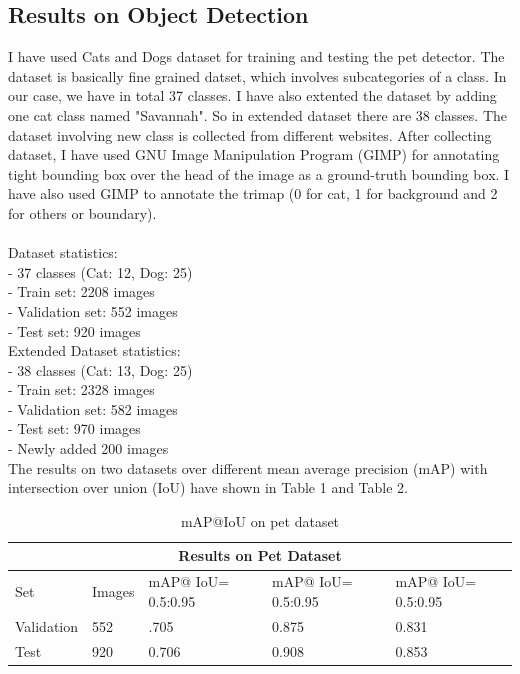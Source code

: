\documentclass[10pt,twocolumn,letterpaper]{article}
\newcommand\tab[1][1cm]{\hspace*{#1}}
\begin{document}
\subsection{Results on Object Detection}
I have used Cats and Dogs\cite{parkhi12a} dataset for training and testing the pet detector. The dataset is basically fine grained datset, which involves subcategories of a class. In our case, we have in total 37 classes. I have also extented the dataset by adding one cat class named "Savannah". So in extended dataset there are 38 classes. The dataset involving new class is collected from different websites. After collecting dataset, I have used GNU Image Manipulation Program (GIMP) for annotating tight bounding box over the head of the image as a ground-truth bounding box. I have also used GIMP to annotate the trimap (0 for cat, 1 for background and 2 for others or boundary).\\\\
Dataset statistics:\\
	\tab- 37 classes (Cat: 12, Dog: 25)\\
	\tab- Train set: 2208 images\\
	\tab- Validation set: 552 images\\
	\tab- Test set: 920 images\\
Extended Dataset statistics:\\ 
	 \tab- 38 classes (Cat: 13, Dog: 25)\\
	 \tab- Train set: 2328 images\\
	 \tab- Validation set: 582 images\\
	 \tab- Test set: 970 images\\
	 \tab- Newly added 200 images\\

The results on two datasets over different mean average precision (mAP) with intersection over union (IoU) have shown in Table 1 and Table 2.

\begin{table}[h]
\begin{tabular}{ |p{1.5cm}||p{1cm}|p{1cm}|p{1cm}|p{1cm}|  }
 \hline
 \multicolumn{5}{|c|}{Results on Pet Dataset} \\
 \hline
 Set & Images & mAP@ IoU= 0.5:0.95 & mAP@ IoU= 0.5:0.95 &mAP@ IoU= 0.5:0.95 \\
 \hline
 Validation & 552 & .705 & 0.875 & 0.831 \\
 \hline
 Test & 920 & 0.706 & 0.908 & 0.853 \\
 \hline
\end{tabular}
\caption{mAP@IoU on pet dataset}
\end{table}
\end{document}

